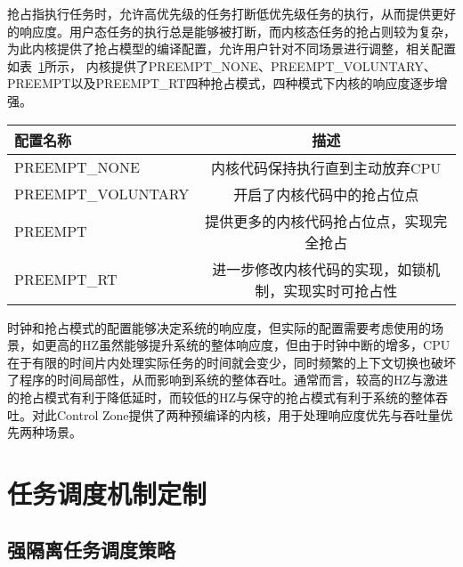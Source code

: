 抢占指执行任务时，允许高优先级的任务打断低优先级任务的执行，从而提供更好的响应度。用户态任务的执行总是能够被打断，而内核态任务的抢占则较为复杂，为此内核提供了抢占模型的编译配置，允许用户针对不同场景进行调整，相关配置如表~\ref{tab:config_preempt}所示， 内核提供了PREEMPT\_NONE、PREEMPT\_VOLUNTARY、PREEMPT以及PREEMPT\_RT四种抢占模式，四种模式下内核的响应度逐步增强。

\begin{table}
    \label{tab:config_preempt}
    \footnotesize%
    \setlength{\tabcolsep}{4pt}%
    \renewcommand{\arraystretch}{1.5}%
    \centering
    \begin{tabular}{lc}
        \hline
        配置名称 & 描述 \\
        \hline
        PREEMPT\_NONE  & 内核代码保持执行直到主动放弃CPU  \\
        PREEMPT\_VOLUNTARY  & 开启了内核代码中的抢占位点 \\
        PREEMPT  & 提供更多的内核代码抢占位点，实现完全抢占 \\
        PREEMPT\_RT & 进一步修改内核代码的实现，如锁机制，实现实时可抢占性 \\
        \hline
    \end{tabular}
\end{table}

时钟和抢占模式的配置能够决定系统的响应度，但实际的配置需要考虑使用的场景，如更高的HZ虽然能够提升系统的整体响应度，但由于时钟中断的增多，CPU在于有限的时间片内处理实际任务的时间就会变少，同时频繁的上下文切换也破坏了程序的时间局部性，从而影响到系统的整体吞吐。通常而言，较高的HZ与激进的抢占模式有利于降低延时，而较低的HZ与保守的抢占模式有利于系统的整体吞吐。对此Control Zone提供了两种预编译的内核，用于处理响应度优先与吞吐量优先两种场景。

\section{任务调度机制定制}


\subsection{强隔离任务调度策略}

